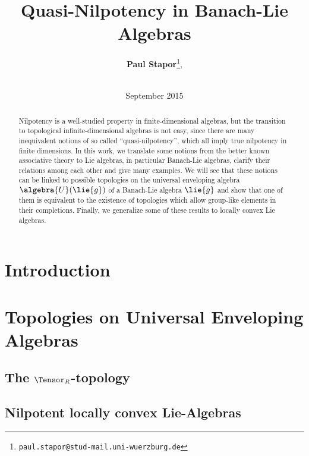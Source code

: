 \documentclass[
11pt,                          %
english                        %
]{article}
\title{Quasi-Nilpotency in Banach-Lie Algebras}
\author{
  \textbf{Paul Stapor}\thanks{\texttt{paul.stapor@stud-mail.uni-wuerzburg.de}},
  \addtocounter{footnote}{2}
  \\[0.5cm]
  \chairXaddress
}
\date{September 2015}
\begin{document}
%
%

\maketitle

%
%

\begin{abstract}
    Nilpotency is a well-studied property in finite-dimensional algebras, but the 
    transition to topological infinite-dimensional algebras is not easy, since there 
    are many inequivalent notions of so called ``quasi-nilpotency'', which all imply 
    true nilpotency in finite dimensions. In this work, we translate some notions 
    from the better known associative theory to Lie algebras, in particular 
    Banach-Lie algebras, clarify their relations among each other and give many 
    examples. We will see that these notions can be linked to possible topologies on 
    the universal enveloping algebra $\algebra{U}(\lie{g})$ of a Banach-Lie algebra 
    $\lie{g}$ and show that one of them is equivalent to the existence of 
    topologies which allow group-like elements in their completions. Finally, we 
    generalize some of these results to locally convex Lie algebras.
\end{abstract}

\newpage


%
%

\tableofcontents
\newpage


%
%

\section{Introduction}
\label{sec:Introduction}



\section{Topologies on Universal Enveloping Algebras}

\subsection{The $\Tensor_R$-topology}

\subsection{Nilpotent locally convex Lie-Algebras}
\end{document}
